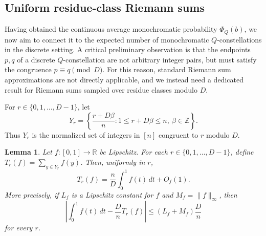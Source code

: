\documentclass[twoside,12pt]{article}
\newcommand{\R}{\mathbb{R}}
\newcommand{\Z}{\mathbb{Z}}
\newcommand{\1}{\mathbf 1}
\newtheorem{lemma}{Lemma}[section]
\begin{document}
\subsection{Uniform residue-class Riemann sums}
Having obtained the continuous average monochromatic probability $\Phi_Q(b)$, we now aim to connect it to the expected number of monochromatic $Q$-constellations in the discrete setting. A critical preliminary observation is that the endpoints $p,q$ of a discrete $Q$-constellation are not arbitrary integer pairs, but must satisfy the congruence $p \equiv q \pmod{D}$. For this reason, standard Riemann sum approximations are not directly applicable, and we instead need a dedicated result for Riemann sums sampled over residue classes modulo $D$.

For \(r\in\{0,1,\dots,D-1\}\), let
\[
Y_r
=
\left\{
\frac{r+D\beta}{n}: 1\le r+D\beta\le n,\ \beta\in\Z
\right\}.
\]
Thus \(Y_r\) is the normalized set of integers in \([n]\) congruent to \(r\)
modulo \(D\).

\begin{lemma}\label{lem:Riemann}
Let \(f:[0,1]\to\R\) be Lipschitz.  For each
\(r\in\{0,1,\dots,D-1\}\), define \(T_r(f)=\sum_{y\in Y_r}f(y)\).  Then,
uniformly in \(r\),
\begin{equation}\label{eq:Riemann-main}
T_r(f)=\frac{n}{D}\int_0^1 f(t)\,dt+O_f(1).
\end{equation}
More precisely, if \(L_f\) is a Lipschitz constant for \(f\) and
\(M_f=\|f\|_\infty\), then
\begin{equation}\label{eq:Riemann-precise}
\left|\int_0^1 f(t)\,dt-\frac{D}{n}T_r(f)\right|
\le (L_f+M_f)\frac{D}{n}
\end{equation}
for every \(r\).
\end{lemma}
\end{document}
